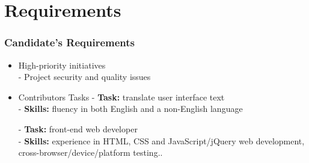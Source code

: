 \section{Requirements}

\begin{frame}[allowframebreaks]
\frametitle{Candidate's Requirements}

    \begin{itemize}
    	\item High-priority initiatives\\
    	- Project security and quality issues\\
    	
    	\item Contributors Tasks\linebreak
    	- \textbf{Task:} translate user interface text\\
    	- \textbf{Skills:} fluency in both English and a non-English language\linebreak
    	
    	- \textbf{Task:} front-end web developer\\
    	- \textbf{Skills:} experience in HTML, CSS and JavaScript/jQuery web development, cross-browser/device/platform testing..
	\end{itemize}

\end{frame}

